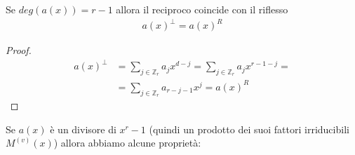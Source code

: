 \begin{prop}
   Se $deg(a(x)) = r-1$ allora il reciproco coincide con il riflesso
   \begin{align*}
      a(x)^{\perp}=a(x)^{R}
   \end{align*}
\end{prop}
\begin{proof}
    \begin{align*}
     a(x)^{\perp}  &= \sum_{j \in \mathbb{Z}_{r}} a_{j}x^{d-j} = \sum_{j \in \mathbb{Z}_{r}} a_{j}x^{r-1-j} = \\ 
                   &= \sum_{j \in \mathbb{Z}_{r}} a_{r-j-1}x^{j}  = a(x)^{R}
   \end{align*}
\end{proof}
Se $a(x)$ è un divisore di $x^r - 1$ (quindi un prodotto dei suoi fattori irriducibili $M^{(v)}(x)$) allora abbiamo alcune proprietà:

